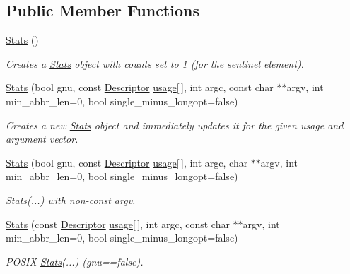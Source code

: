 \subsection*{Public Member Functions}
\begin{DoxyCompactItemize}
\item 
\hyperlink{struct_option_parser_1_1_stats_af488528dadc4a10c77a0135b1205e23d}{Stats} ()
\begin{DoxyCompactList}\small\item\em Creates a \hyperlink{struct_option_parser_1_1_stats}{Stats} object with counts set to 1 (for the sentinel element). \end{DoxyCompactList}\item 
\hyperlink{struct_option_parser_1_1_stats_adb41f21c1a7c4f494f5831d9b8585b8a}{Stats} (bool gnu, const \hyperlink{struct_option_parser_1_1_descriptor}{Descriptor} \hyperlink{_selective_community_detection-_x_8cpp_ae4e685e845abde182eb8fc1f87b756ae}{usage}\mbox{[}$\,$\mbox{]}, int argc, const char $\ast$$\ast$argv, int min\-\_\-abbr\-\_\-len=0, bool single\-\_\-minus\-\_\-longopt=false)
\begin{DoxyCompactList}\small\item\em Creates a new \hyperlink{struct_option_parser_1_1_stats}{Stats} object and immediately updates it for the given {\ttfamily usage} and argument vector. \end{DoxyCompactList}\item 
\hyperlink{struct_option_parser_1_1_stats_a75907970e80d82ec01a8db827012b7af}{Stats} (bool gnu, const \hyperlink{struct_option_parser_1_1_descriptor}{Descriptor} \hyperlink{_selective_community_detection-_x_8cpp_ae4e685e845abde182eb8fc1f87b756ae}{usage}\mbox{[}$\,$\mbox{]}, int argc, char $\ast$$\ast$argv, int min\-\_\-abbr\-\_\-len=0, bool single\-\_\-minus\-\_\-longopt=false)
\begin{DoxyCompactList}\small\item\em \hyperlink{struct_option_parser_1_1_stats}{Stats}(...) with non-\/const argv. \end{DoxyCompactList}\item 
\hyperlink{struct_option_parser_1_1_stats_aed8e2b1777ff408c30b91051fcdd8cfc}{Stats} (const \hyperlink{struct_option_parser_1_1_descriptor}{Descriptor} \hyperlink{_selective_community_detection-_x_8cpp_ae4e685e845abde182eb8fc1f87b756ae}{usage}\mbox{[}$\,$\mbox{]}, int argc, const char $\ast$$\ast$argv, int min\-\_\-abbr\-\_\-len=0, bool single\-\_\-minus\-\_\-longopt=false)
\begin{DoxyCompactList}\small\item\em P\-O\-S\-I\-X \hyperlink{struct_option_parser_1_1_stats}{Stats}(...) (gnu==false). \end{DoxyCompactList}\item 
$$
\end{DoxyCompactItemize}
